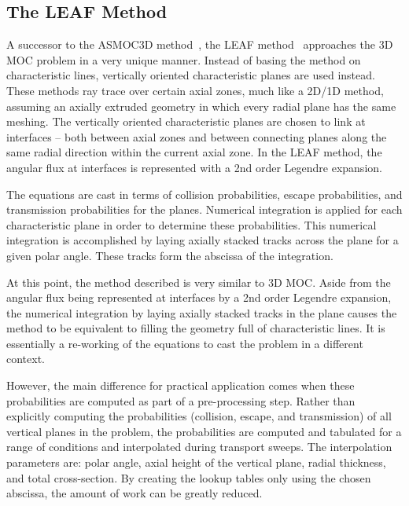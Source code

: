 

\subsection{The LEAF Method}
\label{sec:leaf}

A successor to the ASMOC3D method~\cite{pre_leaf}, the LEAF method~\cite{leaf_init, leaf_method} approaches the 3D \ac{MOC} problem in a very unique manner. Instead of basing the method on characteristic lines, vertically oriented characteristic planes are used instead. These methods ray trace over certain axial zones, much like a 2D/1D method, assuming an axially extruded geometry in which every radial plane has the same meshing. The vertically oriented characteristic planes are chosen to link at interfaces -- both between axial zones and between connecting planes along the same radial direction within the current axial zone. In the LEAF method, the angular flux at interfaces is represented with a 2nd order Legendre expansion.

The equations are cast in terms of collision probabilities, escape probabilities, and transmission probabilities for the planes. Numerical integration is applied for each characteristic plane in order to determine these probabilities. This numerical integration is accomplished by laying axially stacked tracks across the plane for a given polar angle. These tracks form the abscissa of the integration. 

At this point, the method described is very similar to 3D \ac{MOC}. Aside from the angular flux being represented at interfaces by a 2nd order Legendre expansion, the numerical integration by laying axially stacked tracks in the plane causes the method to be equivalent to filling the geometry full of characteristic lines. It is essentially a re-working of the equations to cast the problem in a different context.

However, the main difference for practical application comes when these probabilities are computed as part of a pre-processing step. Rather than explicitly computing the probabilities (collision, escape, and transmission) of all vertical planes in the problem, the probabilities are computed and tabulated for a range of conditions and interpolated during transport sweeps. The interpolation parameters are: polar angle, axial height of the vertical plane, radial thickness, and total cross-section. By creating the lookup tables only using the chosen abscissa, the amount of work can be greatly reduced.


